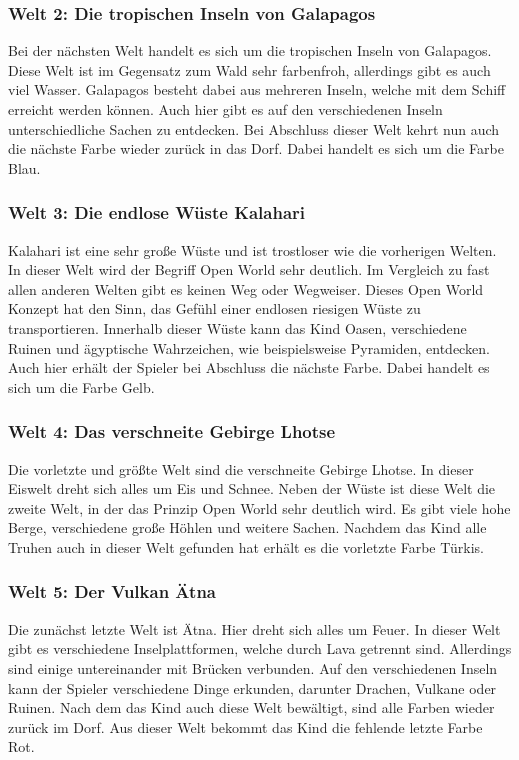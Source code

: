 \subsubsection{Welt 2: Die tropischen Inseln von Galapagos}
	Bei der nächsten Welt handelt es sich um die tropischen Inseln von Galapagos. Diese Welt ist im Gegensatz zum Wald sehr farbenfroh, allerdings gibt es auch viel Wasser. Galapagos besteht dabei aus mehreren Inseln, welche mit dem Schiff erreicht werden können. Auch hier gibt es auf den verschiedenen Inseln unterschiedliche Sachen zu entdecken. Bei Abschluss dieser Welt kehrt nun auch die nächste Farbe wieder zurück in das Dorf. Dabei handelt es sich um die Farbe Blau.
	
\subsubsection{Welt 3: Die endlose Wüste Kalahari}
	Kalahari ist eine sehr große Wüste und ist trostloser wie die vorherigen Welten. In dieser Welt wird der Begriff Open World sehr deutlich. Im Vergleich zu fast allen anderen Welten gibt es keinen Weg oder Wegweiser. Dieses Open World Konzept hat den Sinn, das Gefühl einer endlosen riesigen Wüste zu transportieren. Innerhalb dieser Wüste kann das Kind Oasen, verschiedene Ruinen und ägyptische Wahrzeichen, wie beispielsweise Pyramiden, entdecken. Auch hier erhält der Spieler bei Abschluss die nächste Farbe. Dabei handelt es sich um die Farbe Gelb.
	
\subsubsection{Welt 4: Das verschneite Gebirge Lhotse}
	Die vorletzte und größte Welt sind die verschneite Gebirge Lhotse. In dieser Eiswelt dreht sich alles um Eis und Schnee. Neben der Wüste ist diese Welt die zweite Welt, in der das Prinzip Open World sehr deutlich wird. Es gibt viele hohe Berge, verschiedene große Höhlen und weitere Sachen. Nachdem das Kind alle Truhen auch in dieser Welt gefunden hat erhält es die vorletzte Farbe Türkis.
	
\subsubsection{Welt 5: Der Vulkan Ätna}
	Die zunächst letzte Welt ist Ätna. Hier dreht sich alles um Feuer. In dieser Welt gibt es verschiedene Inselplattformen, welche durch Lava getrennt sind. Allerdings sind einige untereinander mit Brücken verbunden. Auf den verschiedenen Inseln kann der Spieler verschiedene Dinge erkunden, darunter Drachen, Vulkane oder Ruinen. Nach dem das Kind auch diese Welt bewältigt, sind alle Farben wieder zurück im Dorf. Aus dieser Welt bekommt das Kind die fehlende letzte Farbe Rot.
